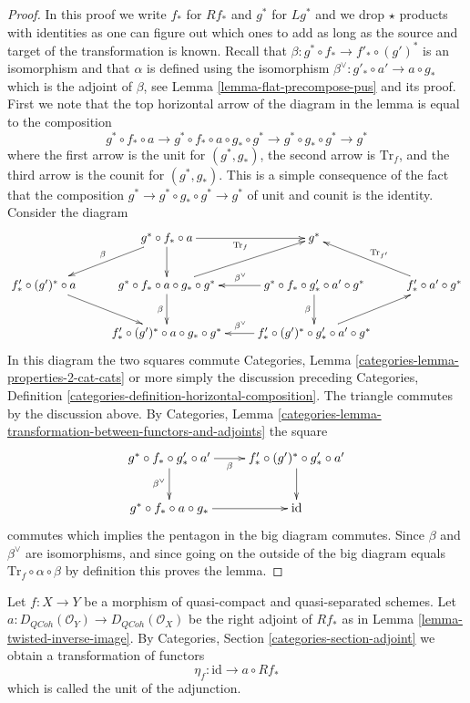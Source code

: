 \documentclass{stacks-project}
\theoremstyle{plain}
\theoremstyle{definition}
\theoremstyle{remark}
\numberwithin{equation}{subsection}
\def\QCoh{\mathit{QCoh}}
\begin{document}
\begin{proof}
In this proof we write $f_*$ for $Rf_*$ and $g^*$ for $Lg^*$ and we
drop $\star$ products with identities as one can figure out which ones
to add as long as the source and target of the transformation is known.
Recall that $\beta : g^* \circ f_* \to f'_* \circ (g')^*$ is an isomorphism
and that $\alpha$ is defined using
the isomorphism $\beta^\vee : g'_* \circ a' \to a \circ g_*$
which is the adjoint of $\beta$, see Lemma \ref{lemma-flat-precompose-pus}
and its proof. First we note that the top horizontal arrow
of the diagram in the lemma is equal to the composition
$$
g^* \circ f_* \circ a \to
g^* \circ f_* \circ a \circ g_* \circ g^* \to
g^* \circ g_* \circ g^* \to g^*
$$
where the first arrow is the unit for $(g^*, g_*)$, the second arrow
is $\text{Tr}_f$, and the third arrow is the counit for $(g^*, g_*)$.
This is a simple consequence of the fact that the composition
$g^* \to g^* \circ g_* \circ g^* \to g^*$ of unit and counit is the identity.
Consider the diagram
$$
\xymatrix{
& g^* \circ f_* \circ a \ar[ld]_\beta \ar[d] \ar[r]_{\text{Tr}_f} & g^* \\
f'_* \circ (g')^* \circ a \ar[dr] &
g^* \circ f_* \circ a \circ g_* \circ g^* \ar[d]_\beta \ar[ru] &
g^* \circ f_* \circ g'_* \circ a' \circ g^* \ar[l]_{\beta^\vee} \ar[d]_\beta &
f'_* \circ a' \circ g^* \ar[lu]_{\text{Tr}_{f'}} \\
& f'_* \circ (g')^* \circ a \circ g_* \circ g^* &
f'_* \circ (g')^* \circ g'_* \circ a' \circ g^* \ar[ru] \ar[l]_{\beta^\vee}
}
$$
In this diagram the two squares commute 
Categories, Lemma \ref{categories-lemma-properties-2-cat-cats}
or more simply the discussion preceding
Categories, Definition \ref{categories-definition-horizontal-composition}.
The triangle commutes by the discussion above. By
Categories, Lemma
\ref{categories-lemma-transformation-between-functors-and-adjoints}
the square
$$
\xymatrix{
g^* \circ f_* \circ g'_* \circ a' \ar[d]_{\beta^\vee} \ar[r]_-\beta &
f'_* \circ (g')^* \circ g'_* \circ a' \ar[d] \\
g^* \circ f_* \circ a \circ g_* \ar[r] &
\text{id}
}
$$
commutes which implies the pentagon in the big diagram commutes.
Since $\beta$ and $\beta^\vee$ are isomorphisms, and since going on
the outside of the big diagram equals
$\text{Tr}_f \circ \alpha \circ \beta$ by definition this proves the lemma.
\end{proof}

\noindent
Let $f : X \to Y$ be a morphism of quasi-compact and quasi-separated
schemes. Let $a : D_\QCoh(\mathcal{O}_Y) \to D_\QCoh(\mathcal{O}_X)$
be the right adjoint of $Rf_*$ as in
Lemma \ref{lemma-twisted-inverse-image}. By
Categories, Section \ref{categories-section-adjoint} we obtain a
transformation of functors
$$
\eta_f : \text{id} \to  a \circ Rf_*
$$
which is called the unit of the adjunction.
\end{document}
